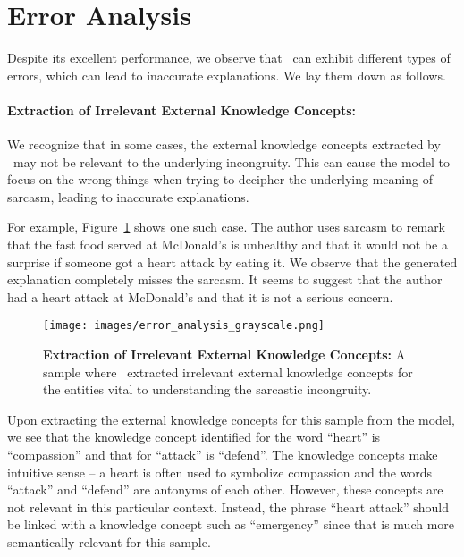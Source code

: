 \section{Error Analysis}
\label{sec:appendix-error-analysis}

Despite its excellent performance, we observe that \model\ can exhibit different types of errors, which can lead to inaccurate explanations. We lay them down as follows.



\paragraph{Extraction of Irrelevant External Knowledge Concepts:} We recognize that in some cases, the external knowledge concepts extracted by \model\ may not be relevant to the underlying incongruity. This can cause the model to focus on the wrong things when trying to decipher the underlying meaning of sarcasm, leading to inaccurate explanations.

For example, Figure~\ref{fig:error-analysis} shows one such case. The author uses sarcasm to remark that the fast food served at McDonald's is unhealthy and that it would not be a surprise if someone got a heart attack by eating it. We observe that the generated explanation completely misses the sarcasm. It seems to suggest that the author had a heart attack at McDonald's and that it is not a serious concern. 

\begin{figure}[!h]
\centering
  \texttt{[image: images/error\_analysis\_grayscale.png]}
  \caption{\textbf{Extraction of Irrelevant External Knowledge Concepts:} A sample where \model\ extracted irrelevant external knowledge concepts for the entities vital to understanding the sarcastic incongruity.
}
\label{fig:error-analysis}
\end{figure}

Upon extracting the external knowledge concepts for this sample from the model, we see that the knowledge concept identified for the word ``heart''  is ``compassion'' and that for ``attack'' is ``defend''. The knowledge concepts make intuitive sense -- a heart is often used to symbolize compassion and the words ``attack'' and ``defend'' are antonyms of each other. However, these concepts are not relevant in this particular context. Instead, the phrase ``heart attack'' should be linked with a knowledge concept such as ``emergency'' since that is much more semantically relevant for this sample. 

